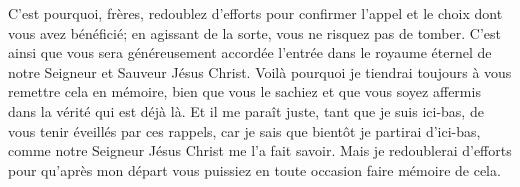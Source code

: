 C’est pourquoi, frères, redoublez d’efforts
		pour confirmer l’appel et le choix dont vous avez bénéficié;
	en agissant de la sorte, vous ne risquez pas de tomber.
C’est ainsi que vous sera généreusement accordée
	l’entrée dans le royaume éternel de notre Seigneur et Sauveur Jésus Christ.
Voilà pourquoi je tiendrai toujours à vous remettre cela en mémoire,
	bien que vous le sachiez et que vous soyez affermis dans la vérité qui est déjà là.
Et il me paraît juste, tant que je suis ici-bas,
	de vous tenir éveillés par ces rappels,
	car je sais que bientôt je partirai d’ici-bas,
	comme notre Seigneur Jésus Christ me l’a fait savoir.
Mais je redoublerai d’efforts pour qu’après mon départ
	vous puissiez en toute occasion faire mémoire de cela.
